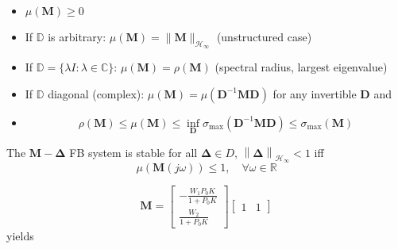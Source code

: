 \begin{itemize}
    \item $\mu(\mathbf{M})\geq0$
    \item If $\mathbb{D}$ is arbitrary: $\mu(\mathbf{M})=\|\mathbf{M}\|_{\mathcal{H}_\infty}$ (unstructured case)
    \item If $\mathbb{D}=\{\lambda I:\lambda\in\mathbb{C}\}$: $\mu(\mathbf{M})=\rho(\mathbf{M})$ (spectral radius, largest eigenvalue)
    \item If $\mathbb{D}$ diagonal (complex): $\mu(\mathbf{M})=\mu(\mathbf{D}^{-1}\mathbf{MD})$ for any invertible $\mathbf{D}$ and
    \item \begin{equation*}
              \rho(\mathbf{M})\leq\mu(\mathbf{M})\leq\inf_{\mathbf{D}}\sigma_{\max}(\mathbf{D}^{-1}\mathbf{MD})\leq\sigma_{\max}(\mathbf{M})
          \end{equation*}
\end{itemize}



The $\mathbf{M}-\boldsymbol{\Delta}$ FB system is stable for all $\boldsymbol{\Delta}\in D$, $\left\|\boldsymbol{\Delta}\right\|_{\mathcal{H}_\infty}<1$ iff
\begin{equation*}
    \mu(\mathbf{M}(j\omega))\leq1,\quad\forall\omega\in\mathbb{R}
\end{equation*}


\begin{equation*}
    \mathbf{M}=\begin{bmatrix}
        -\frac{W_1P_0K}{1+P_0K} \\
        \frac{W_2}{1+P_0K}
    \end{bmatrix}
    \begin{bmatrix}
        1 & 1
    \end{bmatrix}
\end{equation*}
yields

